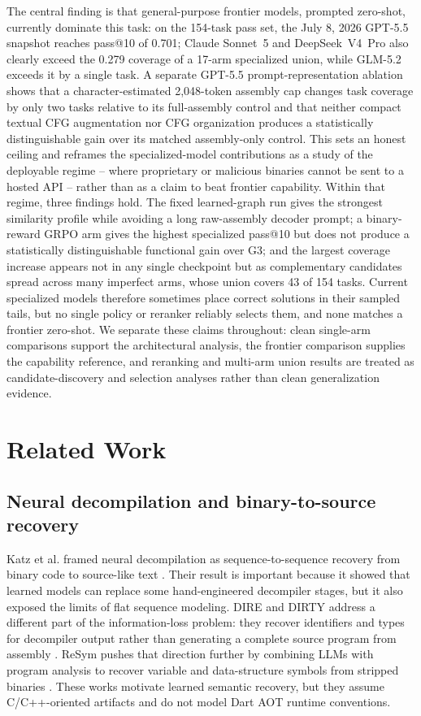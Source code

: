 \documentclass[11pt]{article}
\begin{document}
The central finding is that general-purpose frontier models, prompted zero-shot, currently dominate this task: on the 154-task pass set, the July 8, 2026 GPT-5.5 snapshot reaches pass@10 of 0.701; Claude Sonnet~5 and DeepSeek~V4~Pro also clearly exceed the 0.279 coverage of a 17-arm specialized union, while GLM-5.2 exceeds it by a single task. A separate GPT-5.5 prompt-representation ablation shows that a character-estimated 2{,}048-token assembly cap changes task coverage by only two tasks relative to its full-assembly control and that neither compact textual CFG augmentation nor CFG organization produces a statistically distinguishable gain over its matched assembly-only control. This sets an honest ceiling and reframes the specialized-model contributions as a study of the deployable regime -- where proprietary or malicious binaries cannot be sent to a hosted API -- rather than as a claim to beat frontier capability. Within that regime, three findings hold. The fixed learned-graph run gives the strongest similarity profile while avoiding a long raw-assembly decoder prompt; a binary-reward GRPO arm gives the highest specialized pass@10 but does not produce a statistically distinguishable functional gain over G3; and the largest coverage increase appears not in any single checkpoint but as complementary candidates spread across many imperfect arms, whose union covers 43 of 154 tasks. Current specialized models therefore sometimes place correct solutions in their sampled tails, but no single policy or reranker reliably selects them, and none matches a frontier zero-shot. We separate these claims throughout: clean single-arm comparisons support the architectural analysis, the frontier comparison supplies the capability reference, and reranking and multi-arm union results are treated as candidate-discovery and selection analyses rather than clean generalization evidence.

\section{Related Work}

\subsection{Neural decompilation and binary-to-source recovery}

Katz et al. framed neural decompilation as sequence-to-sequence recovery from binary code to source-like text \cite{katz2018rnn}. Their result is important because it showed that learned models can replace some hand-engineered decompiler stages, but it also exposed the limits of flat sequence modeling. DIRE and DIRTY address a different part of the information-loss problem: they recover identifiers and types for decompiler output rather than generating a complete source program from assembly \cite{lacomis2019dire,chen2022dirty}. ReSym pushes that direction further by combining LLMs with program analysis to recover variable and data-structure symbols from stripped binaries \cite{xie2024resym}. These works motivate learned semantic recovery, but they assume C/C++-oriented artifacts and do not model Dart AOT runtime conventions.
\end{document}
